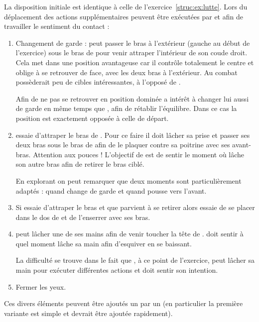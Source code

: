 \begin{exercice}
	\label{att:ex:lutte-variantes}


	La disposition initiale est identique à celle de l'exercice~\ref{struc:ex:lutte}.
	Lors du déplacement des actions supplémentaires peuvent être exécutées par \A et \D afin de travailler le sentiment du contact :
	\begin{enumerate}
		\item Changement de garde : \A peut passer le bras à l'extérieur (gauche au début de l'exercice) sous le bras de \D pour venir attraper l'intérieur de son coude droit.
		Cela met \A dans une position avantageuse car il contrôle totalement le centre et oblige \D à se retrouver de face, avec les deux bras à l'extérieur.
		Au combat \D possèderait peu de cibles intéressantes, à l'opposé de \A.
		
		Afin de ne pas se retrouver en position dominée \D a intérêt à changer lui aussi de garde en même temps que \A, afin de rétablir l'équilibre.
		Dans ce cas la position est exactement opposée à celle de départ.
		
		\item \A essaie d'attraper le bras de \D.
		Pour ce faire il doit lâcher sa prise et passer ses deux bras sous le bras de \D afin de le plaquer contre sa poitrine avec ses avant-bras.
		Attention aux pouces !
		L'objectif de \D est de sentir le moment où \A lâche son autre bras afin de retirer le bras ciblé.
		
		En explorant on peut remarquer que deux moments sont particulièrement adaptés : quand \D change de garde et quand \D pousse vers l'avant.
		
		\item Si \A essaie d'attraper le bras et que \D parvient à se retirer alors \D essaie de se placer dans le dos de \A et de l'enserrer avec ses bras.
		
		\item \A peut lâcher une de ses mains afin de venir toucher la tête de \D.
		\D doit sentir à quel moment \A lâche sa main afin d'esquiver en se baissant.
		
		La difficulté se trouve dans le fait que \A, à ce point de l'exercice, \A peut lâcher sa main pour exécuter différentes actions et \D doit sentir son intention.
		
		\item Fermer les yeux.
	\end{enumerate}
	Ces divers éléments peuvent être ajoutés un par un (en particulier la première variante est simple et devrait être ajoutée rapidement).

\end{exercice}


